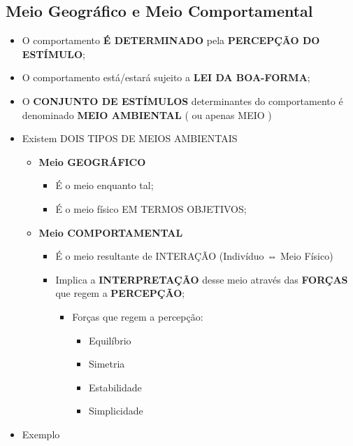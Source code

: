 \documentclass[
]{book}
\providecommand{\tightlist}{%
  \setlength{\itemsep}{0pt}\setlength{\parskip}{0pt}}
\begin{document}
\hypertarget{meio-geogruxe1fico-e-meio-comportamental-1}{%
\subsection{Meio Geográfico e Meio Comportamental}\label{meio-geogruxe1fico-e-meio-comportamental-1}}

\begin{itemize}
\tightlist
\item
  O comportamento \textbf{É DETERMINADO} pela \textbf{PERCEPÇÃO DO ESTÍMULO};
\item
  O comportamento está/estará sujeito a \textbf{LEI DA BOA-FORMA};
\item
  O \textbf{CONJUNTO DE ESTÍMULOS} determinantes do comportamento é denominado \textbf{MEIO AMBIENTAL} ( ou apenas MEIO )
\item
  Existem DOIS TIPOS DE MEIOS AMBIENTAIS

  \begin{itemize}
  \tightlist
  \item
    \textbf{Meio GEOGRÁFICO}

    \begin{itemize}
    \tightlist
    \item
      É o meio enquanto tal;
    \item
      É o meio físico EM TERMOS OBJETIVOS;
    \end{itemize}
  \item
    \textbf{Meio COMPORTAMENTAL}

    \begin{itemize}
    \tightlist
    \item
      É o meio resultante de INTERAÇÃO (Indivíduo ⇔ Meio Físico)
    \item
      Implica a \textbf{INTERPRETAÇÃO} desse meio através das \textbf{FORÇAS} que regem a \textbf{PERCEPÇÃO};

      \begin{itemize}
      \tightlist
      \item
        Forças que regem a percepção:

        \begin{itemize}
        \tightlist
        \item
          Equilíbrio
        \item
          Simetria
        \item
          Estabilidade
        \item
          Simplicidade
        \end{itemize}
      \end{itemize}
    \end{itemize}
  \end{itemize}
\item
  Exemplo


\end{itemize}
\end{document}
